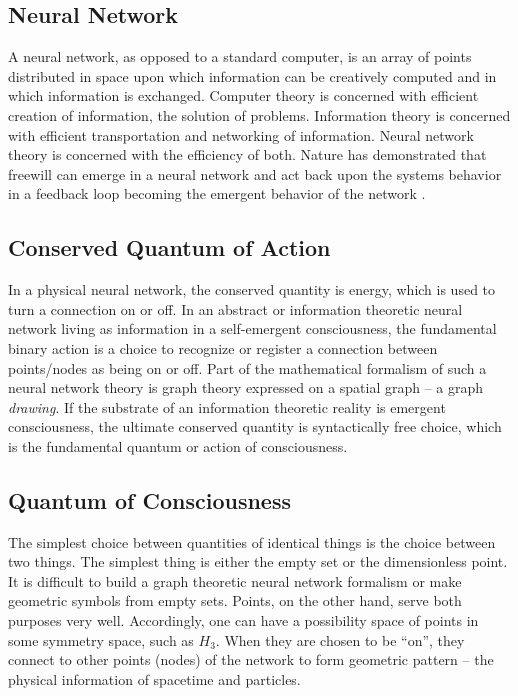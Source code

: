 \documentclass[submission,copyright,creativecommons]{eptcs}
\begin{document}
\subsection{Neural Network}

A neural network, as opposed to a standard computer, is an array of points distributed in space upon which information can be creatively computed and in which information is exchanged. Computer theory is concerned with efficient creation of information, the solution of problems. Information theory is concerned with efficient transportation and networking of information. Neural network theory is concerned with the efficiency of both. Nature has demonstrated that freewill can emerge in a neural network and act back upon the systems behavior in a feedback loop becoming the emergent behavior of the network \cite{aleksander1990introduction}.

\subsection{Conserved Quantum of Action}

In a physical neural network, the conserved quantity is energy, which is used to turn a connection on or off. In an abstract or information theoretic neural network living as information in a self-emergent consciousness, the fundamental binary action is a choice to recognize or register a connection between points/nodes as being on or off. Part of the mathematical formalism of such a neural network theory is graph theory expressed on a spatial graph -- a graph \textit{drawing}. If the substrate of an information theoretic reality is emergent consciousness, the ultimate conserved quantity is syntactically free choice, which is the fundamental quantum or action of consciousness.

\subsection{Quantum of Consciousness}

The simplest choice between quantities of identical things is the choice between two things. The simplest thing is either the empty set or the dimensionless point. It is difficult to build a graph theoretic neural network formalism or make geometric symbols from empty sets. Points, on the other hand, serve both purposes very well. Accordingly, one can have a possibility space of points in some symmetry space, such as $H_{3}$. When they are chosen to be “on”, they connect to other points (nodes) of the network to form geometric pattern -- the physical information of spacetime and particles.
\end{document}
